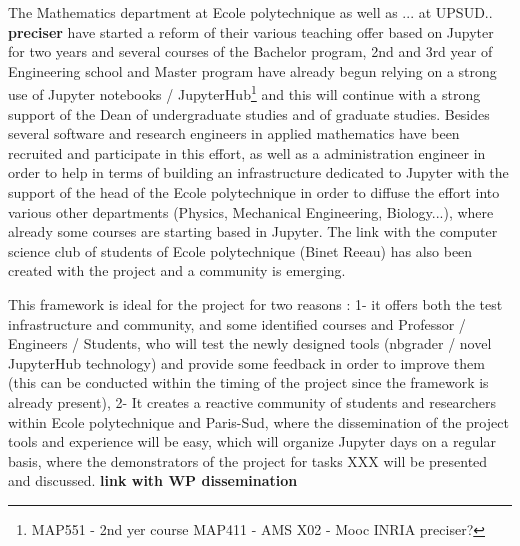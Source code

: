 \begin{task}[
  title=Teaching with Jupyter technology,
  id=teaching,
  lead=EP,
  PM=8, %
  wphases={0-48},
  partners={EP,UPSUD}
  ]


  The Mathematics department at Ecole polytechnique as well as ... at UPSUD..
  {\bf preciser} have started a reform of their various teaching offer based on
  Jupyter for two years and several courses of the Bachelor program, 2nd and 3rd
  year of Engineering school and Master program have already begun relying on a
  strong use of Jupyter notebooks / JupyterHub\footnote{MAP551 - 2nd yer course
  MAP411 - AMS X02 - Mooc INRIA preciser?} and this will continue with a strong
  support of the Dean of undergraduate studies and of graduate studies. Besides
  several software and research engineers in applied mathematics have been
  recruited and participate in this effort, as well as a administration engineer
  in order to help in terms of building an infrastructure dedicated to Jupyter
  with the support of the head of the Ecole polytechnique in order to diffuse
  the effort into various other departments (Physics, Mechanical Engineering,
  Biology...), where already some courses are starting based in Jupyter. The
  link with the computer science club of students of Ecole polytechnique (Binet
  Reeau) has also been created with the project and a community is emerging.

  This framework is ideal for the project for two reasons : 1- it offers both
  the test infrastructure and community, and some identified courses and
  Professor / Engineers / Students, who will test the newly designed tools
  (nbgrader / novel JupyterHub technology) and provide some feedback in order to
  improve them (this can be conducted within the timing of the project since the
  framework is already present), 2- It creates a reactive community of students
  and researchers within Ecole polytechnique and Paris-Sud, where the
  dissemination of the project tools and experience will be easy, which will
  organize Jupyter days on a regular basis, where the demonstrators of the
  project for tasks XXX will be presented and discussed. {\bf link with WP
    dissemination}


\end{task}
